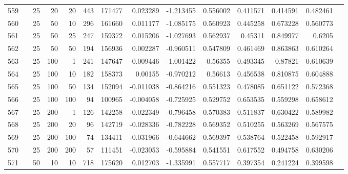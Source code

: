 \begin{longtable}{llrrrrrrrrrrrr}
		559 & &           25 &                20 &           20 &         443 &     171477 &  0.023289 & -1.213455 &  0.556002 &    0.411571 &       0.414591 &  0.482461 \\
		560 & &           25 &                50 &           10 &         296 &     161660 &  0.011177 & -1.085175 &  0.560923 &    0.445258 &       0.673228 &  0.560773 \\
		561 & &           25 &                50 &           25 &         247 &     159372 &  0.015206 & -1.027693 &  0.562937 &     0.45311 &       0.849977 &    0.6205 \\
		562 & &           25 &                50 &           50 &         194 &     156936 &  0.002287 & -0.960511 &  0.547809 &    0.461469 &       0.863863 &  0.610264 \\
		563 & &           25 &               100 &            1 &         241 &     147647 & -0.009446 & -1.001422 &   0.56355 &    0.493345 &        0.87821 &  0.610639 \\
		564 & &           25 &               100 &           10 &         182 &     158373 &   0.00155 & -0.970212 &   0.56613 &    0.456538 &       0.810875 &  0.604888 \\
		565 & &           25 &               100 &           50 &         134 &     152094 & -0.011038 & -0.864216 &  0.551323 &    0.478085 &       0.651122 &  0.572368 \\
		566 & &           25 &               100 &          100 &          94 &     100965 & -0.004058 & -0.725925 &  0.529752 &    0.653535 &       0.559298 &  0.658612 \\
		567 & &           25 &               200 &            1 &         126 &     142258 & -0.022349 & -0.796458 &  0.570383 &    0.511837 &       0.630422 &  0.589982 \\
		568 & &           25 &               200 &           20 &          96 &     142719 & -0.028336 & -0.782228 &  0.569352 &    0.510255 &       0.563269 &  0.567575 \\
		569 & &           25 &               200 &          100 &          74 &     134411 & -0.031966 & -0.644662 &  0.569397 &    0.538764 &       0.522458 &  0.592917 \\
		570 & &           25 &               200 &          200 &          57 &     111451 & -0.023053 & -0.595884 &  0.541551 &    0.617552 &       0.494758 &  0.630206 \\
		571 & &           50 &                10 &           10 &         718 &     175620 &  0.012703 & -1.335991 &  0.557717 &    0.397354 &       0.241224 &  0.399598 \\

\end{longtable}
